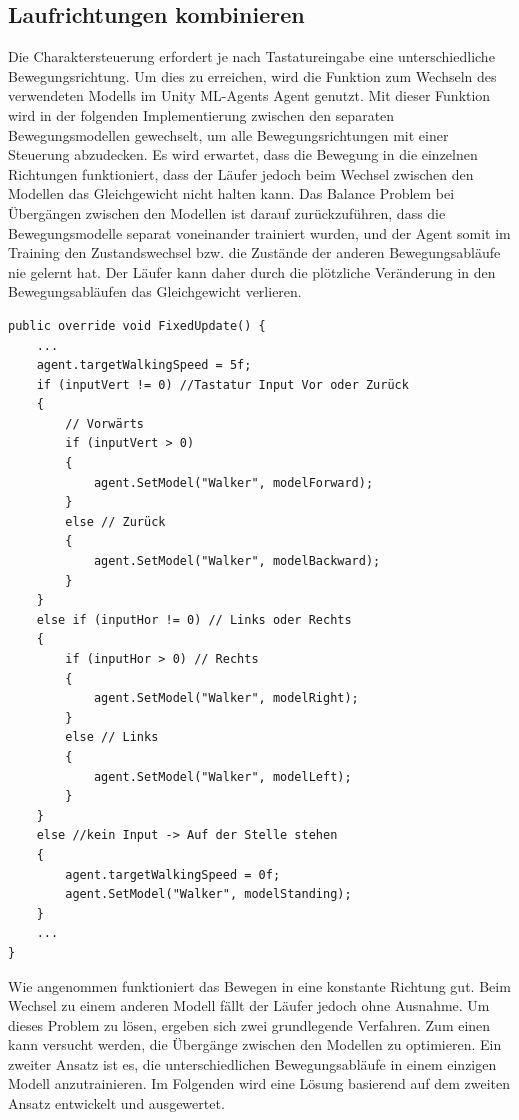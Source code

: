 \subsection{Laufrichtungen kombinieren}
Die Charaktersteuerung erfordert je nach Tastatureingabe eine unterschiedliche Bewegungsrichtung. Um dies zu erreichen, wird die Funktion zum Wechseln des verwendeten Modells im Unity ML-Agents Agent genutzt. Mit dieser Funktion wird in der folgenden Implementierung zwischen den separaten Bewegungsmodellen gewechselt, um alle Bewegungsrichtungen mit einer Steuerung abzudecken. Es wird erwartet, dass die Bewegung in die einzelnen Richtungen funktioniert, dass der Läufer jedoch beim Wechsel zwischen den Modellen das Gleichgewicht nicht halten kann. Das Balance Problem bei Übergängen zwischen den Modellen ist darauf zurückzuführen, dass die Bewegungsmodelle separat voneinander trainiert wurden, und der Agent somit im Training den Zustandswechsel bzw. die Zustände der anderen Bewegungsabläufe nie gelernt hat. Der Läufer kann daher durch die plötzliche Veränderung in den Bewegungsabläufen das Gleichgewicht verlieren.

\begin{lstlisting}[caption={Laufrichtung Modell wechseln},captionpos=b,label={lst:laufrichtung_modell_wechsel}]
public override void FixedUpdate() {
    ...    
    agent.targetWalkingSpeed = 5f;
    if (inputVert != 0) //Tastatur Input Vor oder Zurück
    {
        // Vorwärts
        if (inputVert > 0)
        {
            agent.SetModel("Walker", modelForward);
        }
        else // Zurück
        {
            agent.SetModel("Walker", modelBackward);
        }
    }
    else if (inputHor != 0) // Links oder Rechts
    {
        if (inputHor > 0) // Rechts
        {
            agent.SetModel("Walker", modelRight);
        }
        else // Links
        {
            agent.SetModel("Walker", modelLeft);
        }
    }
    else //kein Input -> Auf der Stelle stehen
    {
        agent.targetWalkingSpeed = 0f;
        agent.SetModel("Walker", modelStanding);
    }
    ...
}
\end{lstlisting}

Wie angenommen funktioniert das Bewegen in eine konstante Richtung gut. Beim Wechsel zu einem anderen Modell fällt der Läufer jedoch ohne Ausnahme. Um dieses Problem zu lösen, ergeben sich zwei grundlegende Verfahren. Zum einen kann versucht werden, die Übergänge zwischen den Modellen zu optimieren. Ein zweiter Ansatz ist es, die unterschiedlichen Bewegungsabläufe in einem einzigen Modell anzutrainieren. Im Folgenden wird eine Lösung basierend auf dem zweiten Ansatz entwickelt und ausgewertet.

